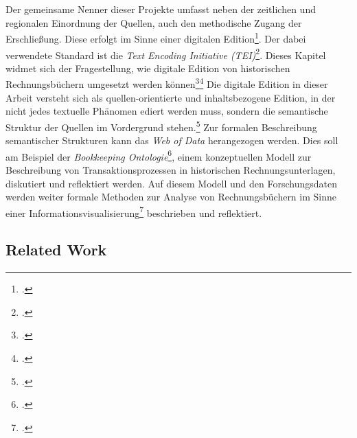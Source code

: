 \documentclass[12pt,a4paper]{article}
\begin{document}
\\
\\
Der gemeinsame Nenner dieser Projekte umfasst neben der zeitlichen und regionalen Einordnung der Quellen, auch den methodische Zugang der Erschließung. Diese erfolgt im Sinne einer digitalen Edition\footcite{sahle2013digitale}. Der dabei verwendete Standard ist die \textit{Text Encoding Initiative (TEI)}\footcite{cummings2013text}. Dieses Kapitel widmet sich der Fragestellung, wie digitale Edition von historischen Rechnungsbüchern umgesetzt werden können\footcite{tomasek2013encoding}\footcite{vogeler2016content} Die digitale Edition in dieser Arbeit versteht sich als quellen-orientierte und inhaltsbezogene Edition, in der nicht jedes textuelle Phänomen ediert werden muss, sondern die semantische Struktur der Quellen im Vordergrund stehen.\footcite{vogeler2019assertive} Zur formalen Beschreibung semantischer Strukturen kann das \textit{Web of Data} herangezogen werden. Dies soll am Beispiel der \textit{Bookkeeping Ontologie}\footcite{pollin2019digital}, einem konzeptuellen Modell zur Beschreibung von Transaktionsprozessen in historischen Rechnungsunterlagen, diskutiert und reflektiert werden. Auf diesem Modell und den Forschungsdaten werden weiter formale Methoden zur Analyse von Rechnungsbüchern im Sinne einer Informationsvisualisierung\footcite{preim2010interaktive} beschrieben und reflektiert.

\subsection{Related Work}
\end{document}
